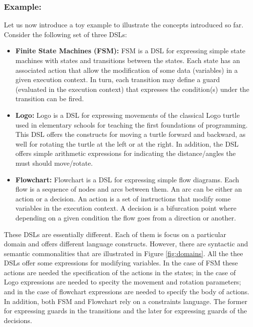 \vspace{-1mm}
\subsubsection{Example:} Let us now introduce a toy example to illustrate the concepts introduced so far. Consider the following set of three DSLs:

\begin{itemize}
\item \textbf{Finite State Machines (FSM):} FSM is a DSL for expressing simple state machines with states and transitions between the states. Each state has an associated action that allow the modification of some data (variables) in a given execution context. In turn, each transition may define a guard (evaluated in the execution context) that expresses the condition(s) under the transition can be fired.

\vspace{2mm}
\item \textbf{Logo:} Logo is a DSL for expressing movements of the classical Logo turtle used in elementary schools for teaching the first foundations of programming. This DSL offers the constructs for moving a turtle forward and backward, as well for rotating the turtle at the left or at the right. In addition, the DSL offers simple arithmetic expressions for indicating the distance/angles the must should move/rotate. 

\vspace{2mm}
\item \textbf{Flowchart:} Flowchart is a DSL for expressing simple flow diagrams. Each flow is a sequence of nodes and arcs between them. An arc can be either an action or a decision. An action is a set of instructions that modify some variables in the execution context. A decision is a bifurcation point where depending on a given condition the flow goes from a direction or another. 
\end{itemize}

These DSLs are essentially different. Each of them is focus on a particular domain and offers different language constructs. However, there are syntactic and semantic commonalities that are illustrated in Figure \ref{fig:domains}. All the thee DSLs offer some expressions for modifying variables. In the case of FSM these actions are needed the specification of the actions in the states; in the case of Logo expressions are needed to specity the movement and rotation parameters; and in the case of flowchart expressions are needed to specify the body of actions. In addition, both FSM and Flowchart rely on a constraints language. The former for expressing guards in the transitions and the later for expressing guards of the decisions.


